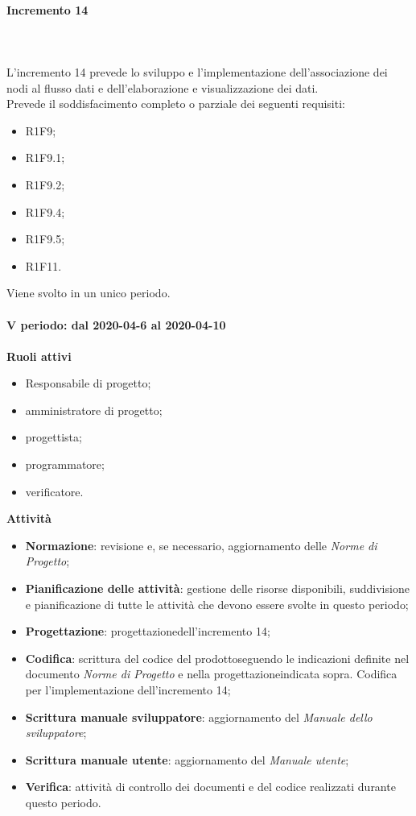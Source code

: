 \paragraph{Incremento 14} \mbox{} \\ \\
L'incremento 14 prevede lo sviluppo e l'implementazione dell'associazione dei nodi al flusso dati e dell'elaborazione e visualizzazione dei dati.
\\Prevede il soddisfacimento completo o parziale dei seguenti requisiti:
\begin{itemize}
	\item R1F9;
	\item R1F9.1;
	\item R1F9.2;
	\item R1F9.4;
	\item R1F9.5;
	\item R1F11.
\end{itemize}
Viene svolto in un unico periodo.
\mbox{} \\ \\ \textbf{V periodo: dal 2020-04-6 al 2020-04-10} \mbox{} \\ \\
\textbf{Ruoli attivi}
\begin{itemize}
	\item Responsabile di progetto\glo;
	\item amministratore di progetto\glo;
	\item progettista;
	\item programmatore;
	\item verificatore.
\end{itemize}
\textbf{Attività} 
\begin{itemize}
	\item \textbf{Normazione}: revisione e, se necessario, aggiornamento delle \textit{Norme di Progetto};
	\item \textbf{Pianificazione delle attività}: gestione delle risorse disponibili, suddivisione e pianificazione di tutte le attività che devono essere svolte in questo periodo;
	\item \textbf{Progettazione}\glo: progettazione\glosp dell'incremento 14;  
	\item \textbf{Codifica}: scrittura del codice del prodotto\glosp seguendo le indicazioni definite nel documento \textit{Norme di Progetto} e nella progettazione\glosp indicata sopra. Codifica per l'implementazione dell'incremento 14;
	\item \textbf{Scrittura manuale sviluppatore}: aggiornamento del \textit{Manuale dello sviluppatore};
	\item \textbf{Scrittura manuale utente}: aggiornamento del \textit{Manuale utente};
	\item \textbf{Verifica}: attività di controllo dei documenti e del codice realizzati durante questo periodo.
\end{itemize}
